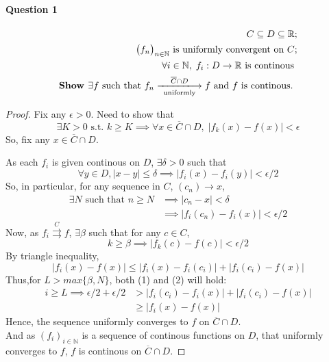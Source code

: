 \documentclass[20pt,a4paper]{extarticle} %
\begin{document}
\paragraph{Question 1} %
\begin{eqnarray*}
	C \subseteq D \subseteq \mathbb{R};\\
	\big(f _n\big)_{n \in \mathbb{N}} \text{ is uniformly convergent on } C ;\\
	\forall i \in \mathbb{N} , \; f_i : D \xrightarrow{} \mathbb{R} \text{ is continous }\\
	\textbf{Show } \exists f \text{ such that } f_n \xlongrightarrow [ \text{ uniformly }]{ \overline{C} \cap D } f
	\text{ and } f \text{ is continous. }
\end{eqnarray*}
\begin{proof}
	Fix any $\epsilon > 0$. Need to show that
	\[ \exists K >0 \text{ s.t. } k\geq K \implies \forall x \in \overline{C} \cap D, \;
	|f_k(x) - f(x) |< \epsilon\]
	So, fix any $x \in \overline{C} \cap D$.

	As each $f_i$ is given continous on $D$, $\exists \delta >0 $ such that
	\[ \forall y \in D, |x-y| \leq \delta \implies |f_i(x) - f_i(y)| < \epsilon/2 \]
	So, in particular, for any sequence in $C$, $(c_n) \rightarrow x$,
	\begin{align*}\label{eq:1}
		\exists N \text{ such that } n\geq N & \implies |c_n - x| < \delta \\
						     & \implies |f_i(c_n) - f_i(x)| < \epsilon/2
	\end{align*}
	Now, as $f_i \overset{C}{\rightrightarrows} f$, $\exists \beta$ such that for any $c \in C$,
	\begin{equation*}\label{eq:2}
		k \geq \beta \implies |f_k(c) - f(c)| < \epsilon/2
	\end{equation*}
	By triangle inequality,
	\[ |f_i(x) - f(x)| \leq |f_i(x) - f_i(c_i)| + |f_i(c_i) - f(x)|\]
	Thus,for $L > max\{ \beta , N \}$, both (1) and (2) will hold:
	\begin{align*}
		i \geq L \implies \epsilon/2 +\epsilon/2 &> |f_i(c_i) - f_i(x)|+ |f_i(c_i) - f(x)| \\
							 &\geq |f_i(x) - f(x) |
	\end{align*}
	Hence, the sequence uniformly converges to $f$ on $\overline{C}\cap D$.\\
	And as $(f_i)_{i \in \mathbb{N}}$ is a sequence of continous functions on $D$, that uniformly converges to $f$,
	$f$ is continous on $\overline{C}\cap D$.
\end{proof}
\end{document}

